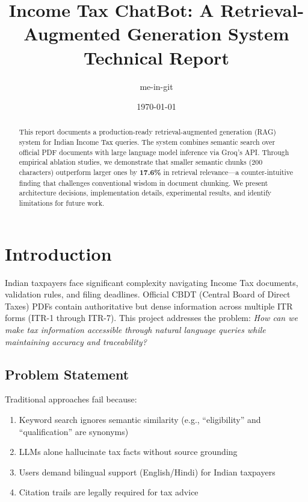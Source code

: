 \documentclass[11pt,a4paper]{article}
\title{\textbf{Income Tax ChatBot: A Retrieval-Augmented Generation System} \\[0.5em] \large Technical Report}
\author{me-in-git}
\date{\today}
\begin{document}
\maketitle

\begin{abstract}
This report documents a production-ready retrieval-augmented generation (RAG) system for Indian Income Tax queries. The system combines semantic search over official PDF documents with large language model inference via Groq's API. Through empirical ablation studies, we demonstrate that smaller semantic chunks (200 characters) outperform larger ones by \textbf{17.6\%} in retrieval relevance---a counter-intuitive finding that challenges conventional wisdom in document chunking. We present architecture decisions, implementation details, experimental results, and identify limitations for future work.
\end{abstract}

\tableofcontents
\newpage

\section{Introduction}
\label{sec:intro}

Indian taxpayers face significant complexity navigating Income Tax documents, validation rules, and filing deadlines. Official CBDT (Central Board of Direct Taxes) PDFs contain authoritative but dense information across multiple ITR forms (ITR-1 through ITR-7). This project addresses the problem: \textit{How can we make tax information accessible through natural language queries while maintaining accuracy and traceability?}

\subsection{Problem Statement}

Traditional approaches fail because:
\begin{enumerate}
    \item Keyword search ignores semantic similarity (e.g., ``eligibility'' and ``qualification'' are synonyms)
    \item LLMs alone hallucinate tax facts without source grounding
    \item Users demand bilingual support (English/Hindi) for Indian taxpayers
    \item Citation trails are legally required for tax advice
\end{enumerate}
\end{document}
